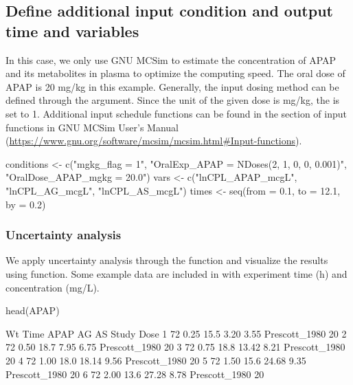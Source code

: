 \hypertarget{define-additional-input-condition-and-output-time-and-variables}{%
\subsection{Define additional input condition and output time and
variables}\label{define-additional-input-condition-and-output-time-and-variables}}

In this case, we only use GNU MCSim to estimate the concentration of
APAP and its metabolites in plasma to optimize the computing speed. The
oral dose of APAP is 20 mg/kg in this example. Generally, the input
dosing method can be defined through the  argument.
Since the unit of the given dose is mg/kg, the  is set
to 1. Additional input schedule functions can be found in the section of
input functions in GNU MCSim User's Manual
(\url{https://www.gnu.org/software/mcsim/mcsim.html\#Input-functions}).

\begin{Schunk}
\begin{Sinput}
conditions <- c("mgkg_flag = 1",
                "OralExp_APAP = NDoses(2, 1, 0, 0, 0.001)",
                "OralDose_APAP_mgkg = 20.0")
vars <- c("lnCPL_APAP_mcgL", "lnCPL_AG_mcgL", "lnCPL_AS_mcgL")
times <- seq(from = 0.1, to = 12.1, by = 0.2)
\end{Sinput}
\end{Schunk}

\hypertarget{uncertainty-analysis}{%
\subsubsection{Uncertainty analysis}\label{uncertainty-analysis}}

We apply uncertainty analysis through the  function
and visualize the results using  function. Some example data
are included in  with experiment time (h) and
concentration (mg/L).

\begin{Schunk}
\begin{Sinput}
head(APAP)
\end{Sinput}
\begin{Soutput}
    Wt Time APAP    AG   AS         Study Dose
  1 72 0.25 15.5  3.20 3.55 Prescott_1980   20
  2 72 0.50 18.7  7.95 6.75 Prescott_1980   20
  3 72 0.75 18.8 13.42 8.21 Prescott_1980   20
  4 72 1.00 18.0 18.14 9.56 Prescott_1980   20
  5 72 1.50 15.6 24.68 9.35 Prescott_1980   20
  6 72 2.00 13.6 27.28 8.78 Prescott_1980   20
\end{Soutput}
\end{Schunk}

